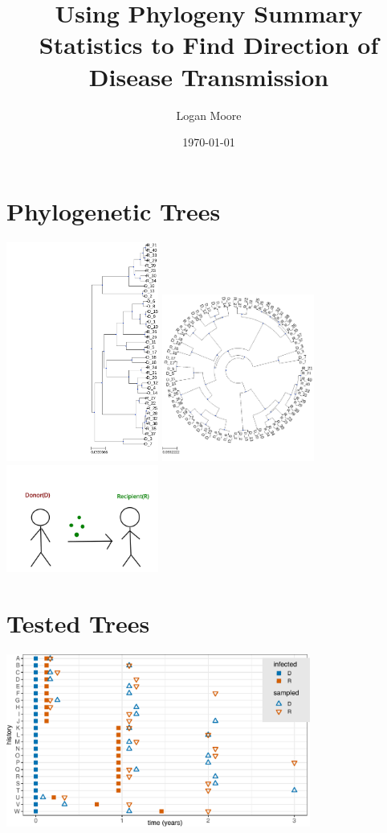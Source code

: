 \documentclass[10pt,aspectratio=169,notheorems,hyperref={pdfauthor=whatever}]{beamer}
\title[
]{Using Phylogeny Summary Statistics to Find Direction of Disease Transmission}
\author[
]{
    Logan Moore 
}
\institute{
    Institute for Computing in Research}
\date{\today}
\begin{document}
{
\begin{frame}
  \titlepage
\end{frame}
}
\addtocounter{framenumber}{-1}

\section{Phylogenetic Trees}
\begin{frame}
  \centering
  \includegraphics[width=5cm, angle=90]{phylotree}
  \includegraphics[width=5cm]{circle_phylo}
  \includegraphics[width=5cm]{donorrecipient}
\end{frame}

\section{Tested Trees}
\begin{frame}
  \centering
  \includegraphics[width=10cm]{histories}
 \end{frame}
\end{document}
